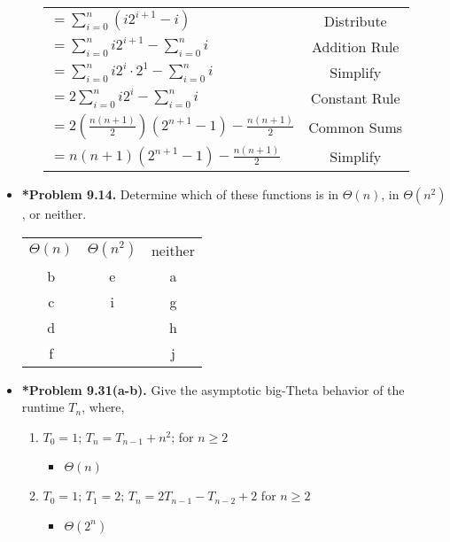 \documentclass[11pt]{article}
\begin{document}
\begin{itemize}
\begin{enumerate}[label=(j)]
\begin{tabular}{l c}
      $= \displaystyle \sum_{i=0}^n (i2^{i+1} - i)$ & Distribute \\[0.25in]
      $= \displaystyle \sum_{i=0}^n i2^{i+1} - \displaystyle \sum_{i=0}^n i$ & Addition Rule \\[0.25in]
      $= \displaystyle \sum_{i=0}^n i2^i \cdot 2^1 - \displaystyle \sum_{i=0}^n i$ & Simplify \\[0.25in]
      $= 2 \displaystyle \sum_{i=0}^n i2^i - \displaystyle \sum_{i=0}^n i$ & Constant Rule \\[0.25in]
      $= 2(\frac{n(n+1)}{2})(2^{n+1} - 1) - \frac{n(n+1)}{2}$ & Common Sums \\[0.25in]
      $= n(n+1)(2^{n+1}-1) - \frac{n(n+1)}{2}$ & Simplify \\[0.25in]
    \end{tabular}
  \end{enumerate}
  \item \textbf{*Problem 9.14.} Determine which of these functions is in $\Theta(n)$, in $\Theta(n^2)$, or neither.\\
  \begin{tabular}{c c c}
    $\Theta(n)$ & $\Theta(n^2)$ & neither \\
    b & e & a\\
    c & i & g\\
    d &   & h\\
    f &   & j\\
  \end{tabular}
  \item \textbf{*Problem 9.31(a-b).} Give the asymptotic big-Theta behavior of the runtime $T_n$, where,
  \begin{enumerate}[label=(\alph*)]
    \item $T_0 = 1$; $T_n = T_{n-1} + n^2$; for $n \geq 2$
    \begin{itemize}[label=]
      \item $\Theta(n)$
    \end{itemize}
    \item $T_0 = 1$; $T_1 = 2$; $T_n = 2T_{n-1} - T_{n-2} + 2$ for $n \geq 2$
    \begin{itemize}[label=]
      \item $\Theta(2^n)$
    \end{itemize}
  \end{enumerate}

\end{itemize}
\end{document}
